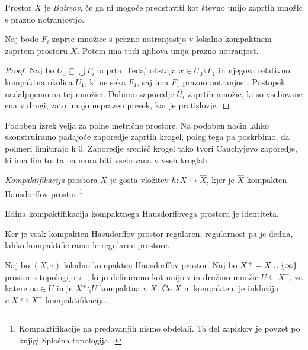 \begin{definicija}
Prostor $X$ je \emph{Baireov}, če ga ni mogoče predstaviti kot
števno unijo zaprtih množic s prazno notranjostjo.
\end{definicija}

\begin{izrek}[Baire]
Naj bodo $F_i$ zaprte množice s prazno notranjostjo v lokalno
kompaktnem zaprtem prostoru $X$. Potem ima tudi njihova unija
prazno notranjost.
\end{izrek}

\begin{proof}
Naj bo $U_0 \subseteq \bigcup F_i$ odprta. Tedaj obstaja
$x \in U_0 \setminus F_1$ in njegova relativno kompaktna okolica
$U_1$, ki ne seka $F_1$, saj ima $F_1$ prazno notranjost. Postopek
nadaljujemo na tej množici. Dobimo zaporedje $\overline{U_i}$
zaprtih množic, ki so vsebovane ena v drugi, zato imajo neprazen
presek, kar je protislovje.
\end{proof}

\begin{opomba}
Podoben izrek velja za polne metrične prostore. Na podoben način
lahko skonstruiramo padajoče zaporedje zaprtih krogel, poleg tega
pa poskrbimo, da polmeri limitirajo k $0$. Zaporedje središč krogel
tako tvori Cauchyjevo zaporedje, ki ima limito, ta pa mora biti
vsebovana v vseh kroglah.
\end{opomba}

\begin{definicija}
\emph{Kompaktifikacija} prostora
$X$ je gosta vložitev $h \colon X \hookrightarrow \hat{X}$, kjer je
$\hat{X}$ kompakten Hausdorffov prostor.\footnote{Kompaktifikacije
na predavanjih nismo obdelali. Ta del zapiskov je povzet po knjigi
Splošna topologija~\cite{stop}.}
\end{definicija}

\begin{opomba}
Edina kompaktifikacija kompaktnega Hausdorffovega prostora je
identiteta.
\end{opomba}

\begin{opomba}
Ker je vsak kompakten Hasudorffov prostor regularen, regularnost pa
je dedna, lahko kompaktificiramo le regularne prostore.
\end{opomba}

\begin{izrek}
Naj bo $(X, \tau)$ lokalno kompakten Hausdorffov prostor. Naj bo
$X^+ = X \cup \left\{\infty\right\}$ prostor s topologijo $\tau^+$, ki jo
definiramo kot unijo $\tau$ in družino množic $U \subseteq X^+$, za
katere $\infty \in U$ in je $X^+ \setminus U$ kompaktna v $X$. Če
$X$ ni kompakten, je inkluzija $i \colon X \hookrightarrow X^+$
kompaktifikacija.
\end{izrek}

